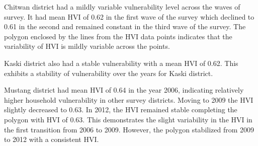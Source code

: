 Chitwan district had a mildly variable vulnerability level across the waves of survey. It had mean HVI of 0.62 in the first wave of the survey which declined to 0.61 in the second and remained constant in the third wave of the survey. The polygon enclosed by the lines from the HVI data points indicates that the variability of HVI is mildly variable across the points. 

Kaski district also had a stable vulnerability with a mean HVI of 0.62. This exhibits a stability of vulnerability over the years for Kaski district. 

Mustang district had mean HVI of 0.64 in the year 2006, indicating relatively higher household vulnerability in other survey districts. Moving to 2009 the HVI slightly decreased to 0.63. In 2012, the HVI remained stable completing the polygon with HVI of 0.63. This demonstrates the slight variability in the HVI in the first transition from 2006 to 2009. However, the polygon stabilized from 2009 to 2012 with a consistent HVI. 

